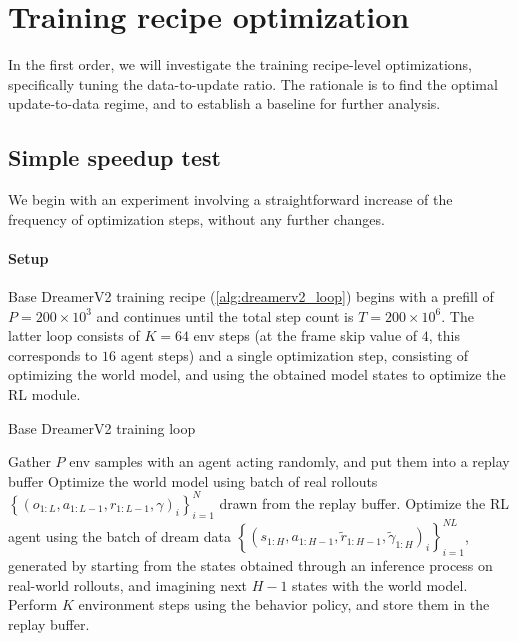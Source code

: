 \documentclass[en]{pracamgr}
\begin{document}
\section{Training recipe optimization}

In the first order, we will investigate the training recipe-level optimizations, specifically tuning the data-to-update ratio. The rationale is to find the optimal update-to-data regime, and to establish a baseline for further analysis.

\subsection{Simple speedup test}
\label{sec:baseline}

We begin with an experiment involving a straightforward increase of the frequency of optimization steps, without any further changes.

\paragraph{Setup} Base DreamerV2 training recipe (\autoref{alg:dreamerv2_loop}) begins with a prefill of $P = 200 \times 10^3$ and continues until the total step count is $T = 200 \times 10^6$. The latter loop consists of $K = 64$ env steps (at the frame skip value of $4$, this corresponds to $16$ agent steps) and a single optimization step, consisting of optimizing the world model, and using the obtained model states to optimize the RL module.

\begin{algorithm}
  \caption{Base DreamerV2 training loop}
  \label{alg:dreamerv2_loop}
  \begin{algorithmic}[1]
    \State Gather $P$ env samples with an agent acting randomly, and put them into a replay buffer
    \State Optimize the world model using batch of real rollouts $\left\{(o_{1:L}, a_{1:L-1}, r_{1:L-1}, \gamma)_i\right\}_{i=1}^N$ drawn from the replay buffer.
    \State Optimize the RL agent using the batch of dream data $\left\{(s_{1:H}, a_{1:H-1}, \widetilde{r}_{1:H-1}, \widetilde{\gamma}_{1:H})_i\right\}_{i=1}^{NL}$, generated by starting from the states obtained through an inference process on real-world rollouts, and imagining next $H-1$ states with the world model.
    \State Perform $K$ environment steps using the behavior policy, and store them in the replay buffer.
    \EndWhile
  \end{algorithmic}
\end{algorithm}
\end{document}
